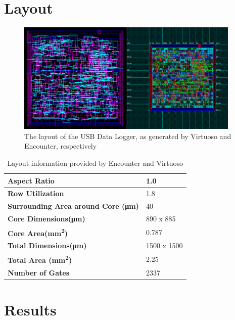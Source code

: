 \documentclass[12pt,letter,oneside]{report}
\begin{document}
\chapter{Layout}
\begin{figure}[h]
	\caption{The layout of the USB Data Logger, as generated by Virtuoso and Encounter, respectively}
	\begin{center}
		\includegraphics[width=0.95\textwidth]{virtuoso}
	\end{center}
\end{figure}
\begin{table}[h]
	\caption{Layout information provided by Encounter and Virtuoso}
	\centering
	\begin{tabular}{| l | l |}
		\hline
		\bf{Aspect Ratio} & 1.0 \\ \hline
		\bf{Row Utilization} &  1.8 \\ \hline
		\bf{Surrounding Area around Core (\si{\micro\meter})} & 40 \\ \hline
		\bf{Core Dimensions(\si{\micro\meter})} & 890 x 885 \\ \hline
		\bf{Core Area(\si{\milli\meter\squared})} & 0.787 \\ \hline
		\bf{Total Dimensions(\si{\micro\meter})} & 1500 x 1500 \\ \hline
		\bf{Total Area (\si{\milli\meter\squared})} & 2.25 \\ \hline
		\bf{Number of Gates} & 2337 \\ \hline
	\end{tabular}
\end{table}
\chapter{Results}
\end{document}
